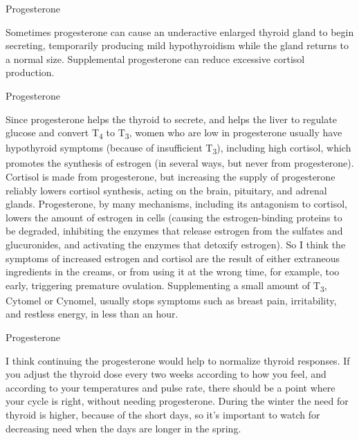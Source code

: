 \documentclass[11pt,oneside,openany,extrafontsizes]{memoir}
\begin{document}
\begin{standalonequote}{Progesterone}

    \begin{answer}
        Sometimes progesterone can cause an underactive enlarged thyroid gland to begin secreting, temporarily producing mild hypothyroidism while the gland returns to a normal size. Supplemental progesterone can reduce excessive cortisol production.
    \end{answer}
\end{standalonequote}

\begin{standalonequote}{Progesterone}

    \begin{answer}
        Since progesterone helps the thyroid to secrete, and helps the liver to regulate glucose and convert T\textsubscript{4} to T\textsubscript{3}, women who are low in progesterone usually have hypothyroid symptoms (because of insufficient T\textsubscript{3}), including high cortisol, which promotes the synthesis of estrogen (in several ways, but never from progesterone). Cortisol is made from progesterone, but increasing the supply of progesterone reliably lowers cortisol synthesis, acting on the brain, pituitary, and adrenal glands. Progesterone, by many mechanisms, including its antagonism to cortisol, lowers the amount of estrogen in cells (causing the estrogen-binding proteins to be degraded, inhibiting the enzymes that release estrogen from the sulfates and glucuronides, and activating the enzymes that detoxify estrogen). So I think the symptoms of increased estrogen and cortisol are the result of either extraneous ingredients in the creams, or from using it at the wrong time, for example, too early, triggering premature ovulation. Supplementing a small amount of T\textsubscript{3}, Cytomel or Cynomel, usually stops symptoms such as breast pain, irritability, and restless energy, in less than an hour.
    \end{answer}
\end{standalonequote}

\begin{standalonequote}{Progesterone}

    \begin{answer}
        I think continuing the progesterone would help to normalize thyroid responses. If you adjust the thyroid dose every two weeks according to how you feel, and according to your temperatures and pulse rate, there should be a point where your cycle is right, without needing progesterone. During the winter the need for thyroid is higher, because of the short days, so it's important to watch for decreasing need when the days are longer in the spring.
    \end{answer}
\end{standalonequote}
\end{document}
